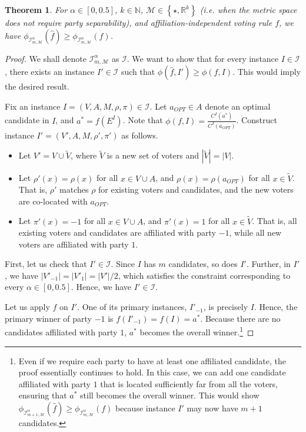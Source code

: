 \documentclass[letterpaper]{article} %
\newtheorem{theorem}{Theorem}
\theoremstyle{definition}
\newcommand{\set}[1]{\left\{#1\right\}}
\renewcommand{\hat}{\widehat}
\renewcommand{\tilde}{\widetilde}
\newcommand{\bbN}{\mathbb{N}}
\newcommand{\bbR}{\mathbb{R}}
\newcommand{\calI}{\mathcal{I}}
\newcommand{\calM}{\mathcal{M}}
\newcommand{\pleft}{-1}
\newcommand{\pright}{1}
\newcommand{\I}{\calI}
\begin{document}
\begin{theorem}
\label{thm:large-primaries-not-better-all}
	For $\alpha \in [0,0.5]$, $k \in \bbN$, $\calM \in \set{\star,\bbR^k}$ (i.e. when the metric space does not require party separability), and affiliation-independent voting rule $f$, we have $\phi_{\I^{\alpha}_{m,\calM}}(\hat{f}) \ge \phi_{\I^{\alpha}_{m,\calM}}(f)$. 
\end{theorem}
\begin{proof}
We shall denote $\I^{\alpha}_{m,\calM}$ as $\I$. We want to show that for every instance $I \in \I$, there exists an instance $I' \in \I$ such that $\phi(\hat{f},I') \ge \phi(f,I)$. This would imply the desired result.
	
	Fix an instance $I = (V,A,M,\rho,\pi) \in \I$. Let $a_{OPT} \in A$ denote an optimal candidate in $I$, and $a^* = f(E^I)$. Note that $\phi(f,I) = \frac{C^I(a^*)}{C^I(a_{OPT})}$. Construct instance $I' = (V',A,M,\rho',\pi')$ as follows. 
	\begin{itemize}
		\item Let $V' = V \cup \tilde{V}$, where $\tilde{V}$ is a new set of voters and $|\tilde{V}| = |V|$.
		
		\item Let $\rho'(x) = \rho(x)$ for all $x \in V \cup A$, and $\rho(x) = \rho(a_{OPT})$ for all $x \in \tilde{V}$. That is, $\rho'$ matches $\rho$ for existing voters and candidates, and the new voters are co-located with $a_{OPT}$.
		
		\item Let $\pi'(x) = \pleft$ for all $x \in V \cup A$, and $\pi'(x) = \pright$ for all $x \in \tilde{V}$. That is, all existing voters and candidates are affiliated with party $\pleft$, while all new voters are affiliated with party $\pright$.
	\end{itemize}

	First, let us check that $I' \in \I$. Since $I$ has $m$ candidates, so does $I'$. Further, in $I'$, we have $|V'_{\pleft}| = |V'_{\pright}| = |V'|/2$, which satisfies the constraint corresponding to every $\alpha \in [0,0.5]$. Hence, we have $I' \in \I$. 

	Let us apply $\hat{f}$ on $I'$. One of its primary instances, $I'_{\pleft}$, is precisely $I$. Hence, the primary winner of party $\pleft$ is $f(I'_{\pleft}) = f(I) = a^*$. Because there are no candidates affiliated with party $\pright$, $a^*$ becomes the overall winner.\footnote{Even if we require each party to have at least one affiliated candidate, the proof essentially continues to hold. In this case, we can add one candidate affiliated with party $\pright$ that is located sufficiently far from all the voters, ensuring that $a^*$ still becomes the overall winner. This would show $\phi_{\I^{\alpha}_{m+1,\calM}}(\hat{f}) \ge \phi_{\I^{\alpha}_{m,\calM}}(f)$ because instance $I'$ may now have $m+1$ candidates.}
	

\end{proof}
\end{document}
